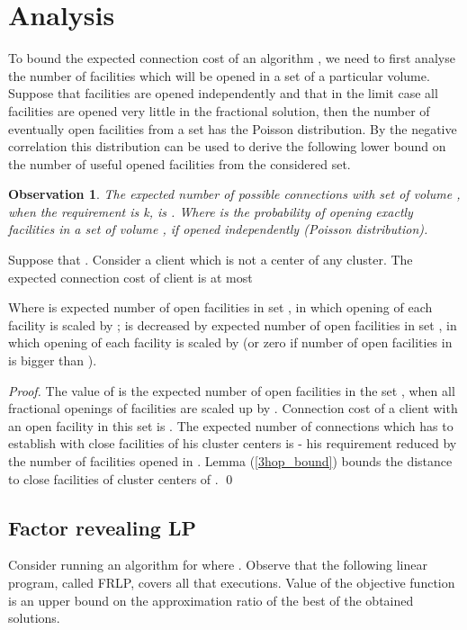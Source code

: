 \documentclass{llncs}
\newtheorem{observation}{\textbf{Observation}}
\begin{document}
\section{Analysis}

To bound the expected connection cost of an algorithm , we need to first analyse the number of facilities which will be opened in a set of a particular volume. Suppose that facilities are opened independently and that in the limit case all facilities are opened very little in the fractional solution, then the number of eventually open facilities from a set has the Poisson distribution. By the negative correlation this distribution can be used to derive the following lower bound on the number of useful opened facilities from the considered set.

\begin{observation} 
The expected number of possible connections with set  of volume , when the requirement is k, is . Where  is the probability of opening exactly  facilities in a set of volume , if opened independently (Poisson distribution).
\end{observation}

\begin{lemma}
\label{alg_A_connection_cost}
Suppose that . Consider a client  which is not a center of any cluster. The expected connection cost of client  is at most

Where  is expected number of open facilities in set , in which opening of each facility is scaled by ;  is  decreased by expected number of open facilities in set , in which opening of each facility is scaled by  (or zero if number of open facilities in  is bigger than ).
\end{lemma}

\begin{proof}
 The value of  is the expected number of open facilities in the set , when all fractional openings of facilities are scaled up by . Connection cost of a client  with an open facility in this set is . The expected number of connections which  has to establish with close facilities of his cluster centers is  - his requirement reduced by the number of facilities opened in . Lemma (\ref{3hop_bound}) bounds the distance to close facilities of cluster centers of .
 \qed
\end{proof}

\subsection{Factor revealing LP}
\label{lp_factor_revel}
Consider running an algorithm  for  where . Observe that the following linear program, called FRLP, covers all that executions. Value of the objective function is an upper bound on the approximation ratio of the best of the obtained solutions.
\end{document}
